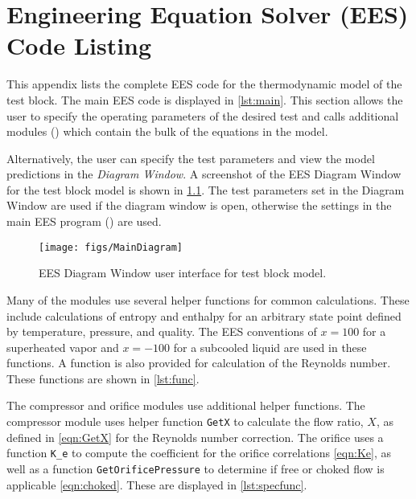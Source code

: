\chapter{Engineering Equation Solver (EES) Code Listing} \label{app:code}

This appendix lists the complete EES code for the thermodynamic model of the test block.
The main EES code is displayed in \cref{lst:main}. This section allows the user to specify
the operating parameters of the desired test and calls additional modules
() 
which contain 
the bulk of the equations in the model. 


Alternatively, the user can specify the test parameters and view the model 
predictions in the \emph{Diagram Window}. A screenshot of the EES Diagram Window 
for the test block model is shown in \cref{fig:DiagWindow}. The test parameters
set in the Diagram Window are used if the diagram window is open, otherwise the
settings in the main EES program () are used.
\begin{figure}[htbp]
	\centering
  \texttt{[image: figs/MainDiagram]}
	\caption{EES Diagram Window user interface for test block model.}
	\label{fig:DiagWindow}
\end{figure}

Many of the modules use several helper functions for common calculations.
These include calculations of entropy and enthalpy for an arbitrary state point
defined by temperature, pressure, and quality. The EES conventions of $x=100$ for
a superheated vapor and $x=-100$ for a subcooled liquid are used in these functions.
A function is also provided for calculation of the Reynolds number.
These functions are shown in \cref{lst:func}.


The compressor and orifice modules use additional helper functions.
The compressor module uses helper function \verb+GetX+ to calculate the flow ratio, $X$,
as defined in \cref{eqn:GetX} for the Reynolds number correction.
The orifice uses a function \verb+K_e+ to compute the coefficient for the orifice correlations \cref{eqn:Ke},
as well as a function \verb+GetOrificePressure+ to determine if free or choked flow is applicable \cref{eqn:choked}.
These are displayed in \cref{lst:specfunc}.


